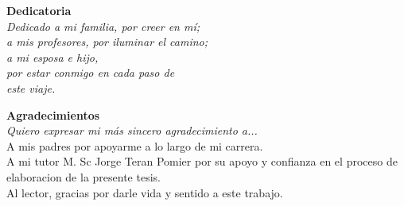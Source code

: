 \documentclass[12pt, openany]{book}
\title{
    \textbf{
      \Large{UNIVERSIDAD MAYOR DE SAN ANDR\'ES}\\
      \normalsize{
        FACULTAD DE CIENCIAS PURAS Y NATURALES\\
        CARRERA DE INFORM\'ATICA\\
      }
      \hfill \break
      \texttt{[image: umsa]}
      \break
      \begin{large}
        EVALUACION COMPARATIVA DE MODELOS GENERADORES DE GRAFOS ALEATORIOS PARA REDES COMPLEJAS
      \end{large}
      \break
      \small{
        Tesis de Grado para obtener el Título de Licenciatura en Informática \break
        Mención Ingeniería de Sistemas Informáticos\break
      }
      \break
      \large {
        POR: CARLOS MIJAEL TOLA APAZA\\
        TUTOR: M.Sc. JORGE TERAN
      }
      \break
      \small {
        LA PAZ - BOLIVIA \break
        Abril, 2024
      }
    }
}
\author{}
\date{}
\begin{document}
\maketitle


\thispagestyle{empty}
\vspace*{\fill} 

\begin{flushright}
  \textbf{Dedicatoria} \\
\textit{Dedicado a mi familia, por creer en mí;\\
 a mis profesores, por iluminar el camino;\\ 
a mi esposa e hijo, \\ 
por estar conmigo en cada paso de  \\
este viaje.}
\end{flushright}

\vspace{2cm} 
\newpage

\thispagestyle{empty} 

\vspace*{\fill} 

\begin{flushleft}
\textbf{Agradecimientos}\\ 
\textit{Quiero expresar mi más sincero agradecimiento a...}\\
A mis padres por apoyarme a lo largo de mi carrera. \\
A mi tutor M. Sc Jorge Teran Pomier por su apoyo y confianza en el proceso de elaboracion
de la presente tesis.\\
Al lector, gracias por darle vida y sentido a este trabajo.
\end{flushleft}

\vspace*{\fill} %

\newpage

\tableofcontents

\newpage
\listoffigures
\newpage


\doublespacing
{}







\end{document}
